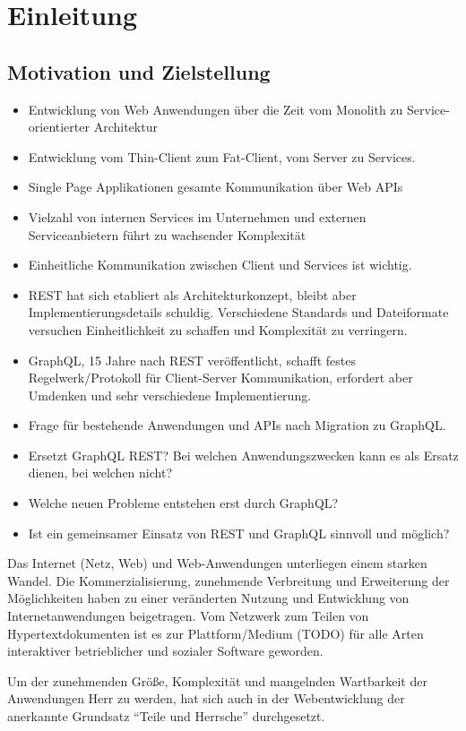 \chapter{Einleitung}

\section{Motivation und Zielstellung}
\begin{itemize}
  \item Entwicklung von Web Anwendungen über die Zeit vom Monolith zu Service-orientierter Architektur
  \item Entwicklung vom Thin-Client zum Fat-Client, vom Server zu Services.
  \item Single Page Applikationen gesamte Kommunikation über Web APIs
  \item Vielzahl von internen Services im Unternehmen und externen Serviceanbietern führt zu wachsender Komplexität
  \item Einheitliche Kommunikation zwischen Client und Services ist wichtig.
  \item REST hat sich etabliert als Architekturkonzept, bleibt aber Implementierungsdetails schuldig. Verschiedene Standards und Dateiformate versuchen Einheitlichkeit zu schaffen und Komplexität zu verringern.
  \item GraphQL, 15 Jahre nach REST veröffentlicht, schafft festes Regelwerk/Protokoll für Client-Server Kommunikation, erfordert aber Umdenken und sehr verschiedene Implementierung.
  \item Frage für bestehende Anwendungen und APIs nach Migration zu GraphQL\@.
  \item Ersetzt GraphQL REST\@? Bei welchen Anwendungszwecken kann es als Ersatz dienen, bei welchen nicht?
  \item Welche neuen Probleme entstehen erst durch GraphQL\@?
  \item Ist ein gemeinsamer Einsatz von REST und GraphQL sinnvoll und möglich?
\end{itemize}
Das Internet (Netz, Web) und Web-Anwendungen unterliegen einem starken Wandel.
Die Kommerzialisierung, zunehmende Verbreitung und Erweiterung der Möglichkeiten haben zu einer veränderten Nutzung und Entwicklung von Internetanwendungen beigetragen.
Vom Netzwerk zum Teilen von Hypertextdokumenten ist es zur Plattform/Medium (TODO) für alle Arten interaktiver betrieblicher und sozialer Software geworden.
\par
Um der zunehmenden Größe, Komplexität und mangelnden Wartbarkeit der Anwendungen Herr zu werden, hat sich auch in der Webentwicklung der anerkannte Grundsatz \enquote{Teile und Herrsche} durchgesetzt.

